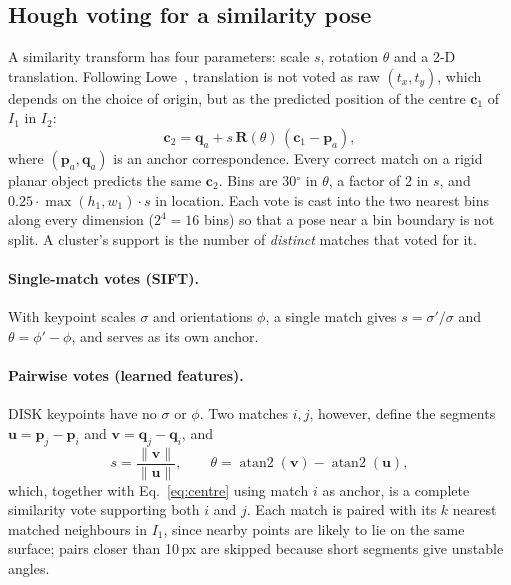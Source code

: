 \documentclass{article}
\begin{document}
\subsection{Hough voting for a similarity pose}
A similarity transform has four parameters: scale $s$, rotation $\theta$ and a
2-D translation. Following Lowe~\cite{lowe2004sift}, translation is not voted
as raw $(t_x, t_y)$, which depends on the choice of origin, but as the
predicted position of the centre $\mathbf{c}_1$ of $I_1$ in $I_2$:
\begin{equation}
  \mathbf{c}_2 = \mathbf{q}_a + s\,\mathbf{R}(\theta)\,(\mathbf{c}_1 - \mathbf{p}_a),
  \label{eq:centre}
\end{equation}
where $(\mathbf{p}_a, \mathbf{q}_a)$ is an anchor correspondence. Every
correct match on a rigid planar object predicts the same $\mathbf{c}_2$. Bins
are 30$^\circ$ in $\theta$, a factor of 2 in $s$, and
$0.25\cdot\max(h_1,w_1)\cdot s$ in location. Each vote is cast into the two
nearest bins along every dimension ($2^4 = 16$ bins) so that a pose near a
bin boundary is not split. A cluster's support is the number of
\emph{distinct} matches that voted for it.

\paragraph{Single-match votes (SIFT).} With keypoint scales $\sigma$ and
orientations $\phi$, a single match gives $s = \sigma'/\sigma$ and
$\theta = \phi' - \phi$, and serves as its own anchor.

\paragraph{Pairwise votes (learned features).} DISK keypoints have no $\sigma$
or $\phi$. Two matches $i, j$, however, define the segments
$\mathbf{u} = \mathbf{p}_j - \mathbf{p}_i$ and
$\mathbf{v} = \mathbf{q}_j - \mathbf{q}_i$, and
\begin{equation}
  s = \frac{\lVert\mathbf{v}\rVert}{\lVert\mathbf{u}\rVert},\qquad
  \theta = \operatorname{atan2}(\mathbf{v}) - \operatorname{atan2}(\mathbf{u}),
  \label{eq:pair}
\end{equation}
which, together with Eq.~\eqref{eq:centre} using match $i$ as anchor, is a
complete similarity vote supporting both $i$ and $j$. Each match is paired
with its $k$ nearest matched neighbours in $I_1$, since nearby points are
likely to lie on the same surface; pairs closer than 10\,px are skipped
because short segments give unstable angles.
\end{document}
